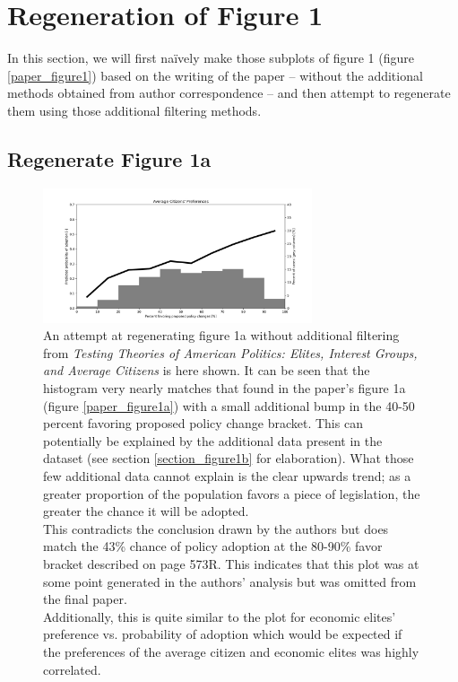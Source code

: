\documentclass[]{article}
\begin{document}
\newpage
\section{Regeneration of Figure 1}
In this section, we will first naïvely make those subplots of figure 1 (figure \ref{paper_figure1}) based on the writing of the paper -- without the additional methods obtained from author correspondence -- and then attempt to regenerate them using those additional filtering methods.

\subsection{Regenerate Figure 1a}
\begin{figure}[H]
	\begin{center}
		\includegraphics[width=300px]{./figures/generated/average-citizens-preferences.png}
	\end{center}	
	\caption{An attempt at regenerating figure 1a without additional filtering from \textit{Testing Theories of American Politics: Elites, Interest Groups, and Average Citizens} is here shown. It can be seen that the histogram very nearly matches that found in the paper's figure 1a (figure \ref{paper_figure1a}) with a small additional bump in the 40-50 percent favoring proposed policy change bracket. This can potentially be explained by the additional data present in the dataset (see section \ref{section_figure1b} for elaboration). What those few additional data cannot explain is the clear upwards trend; as a greater proportion of the population favors a piece of legislation, the greater the chance it will be adopted. \\This contradicts the conclusion drawn by the authors but does match the 43\% chance of policy adoption at the 80-90\% favor bracket described on page 573R. This indicates that this plot was at some point generated in the authors' analysis but was omitted from the final paper.\\Additionally, this is quite similar to the plot for economic elites' preference vs. probability of adoption which would be expected if the preferences of the average citizen and economic elites was highly correlated.}
	\label{generated_figure1a}
\end{figure}
\end{document}

